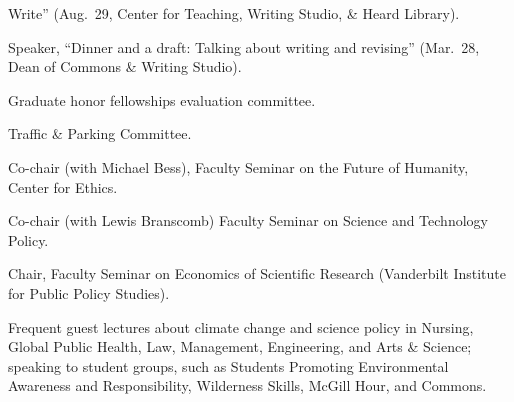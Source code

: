   Write'' (Aug.~29, Center for Teaching, Writing Studio, \& Heard Library).
\item[2013] Speaker, ``Dinner and a draft: Talking about writing and revising''
  (Mar.~28, Dean of Commons \& Writing Studio).
\item[2013] Graduate honor fellowships evaluation committee.
\item[2010--2013] Traffic \& Parking Committee.
\item[2008] Co-chair (with Michael Bess), Faculty Seminar on the Future of
  Humanity, Center for Ethics.
\item[1999--2000] Co-chair (with Lewis Branscomb) Faculty Seminar on Science
  and Technology Policy.
\item[1996--1997] Chair, Faculty Seminar on Economics of Scientific Research
  (Vanderbilt Institute for Public Policy Studies).
\item[Ongoing] Frequent guest lectures about climate change and science policy
  in Nursing, Global Public Health, Law, Management, Engineering, and Arts \&
  Science; speaking to student groups, such as Students Promoting Environmental
  Awareness and Responsibility, Wilderness Skills, McGill Hour, and Commons.

